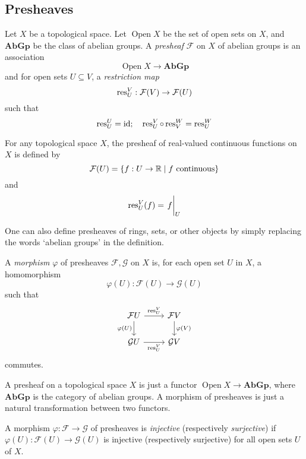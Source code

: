 \subsection{Presheaves}
\begin{definition}
    Let \( X \) be a topological space.
    Let \( \operatorname{Open} X \) be the set of open sets on \( X \), and \( \mathbf{AbGp} \) be the class of abelian groups.
    A \emph{presheaf} \( \mathcal F \) on \( X \) of abelian groups is an association
    \[ \operatorname{Open} X \to \mathbf{AbGp} \]
    and for open sets \( U \subseteq V \), a \emph{restriction map}
    \[ \operatorname{res}_U^V : \mathcal F(V) \to \mathcal F(U) \]
    such that
    \[ \operatorname{res}_U^U = \operatorname{id};\quad \operatorname{res}_U^V \circ \operatorname{res}_V^W = \operatorname{res}_U^W \]
\end{definition}
\begin{example}
    For any topological space \( X \), the presheaf of real-valued continuous functions on \( X \) is defined by
    \[ \mathcal F(U) = \qty{f : U \to \mathbb R \mid f \text{ continuous}} \]
    and
    \[ \res_U^V(f) = \eval{f}_U \]
\end{example}
One can also define presheaves of rings, sets, or other objects by simply replacing the words `abelian groups' in the definition.
\begin{definition}
    A \emph{morphism} \( \varphi \) of presheaves \( \mathcal F, \mathcal G \) on \( X \) is, for each open set \( U \) in \( X \), a homomorphism
    \[ \varphi(U) : \mathcal F(U) \to \mathcal G(U) \]
    such that
    \[\begin{tikzcd}
        {\mathcal F U} & {\mathcal F V} \\
        {\mathcal G U} & {\mathcal G V}
        \arrow["{\res_U^V}", from=1-1, to=1-2]
        \arrow["{\varphi(V)}", from=1-2, to=2-2]
        \arrow["{\varphi(U)}"', from=1-1, to=2-1]
        \arrow["{\res_U^V}"', from=2-1, to=2-2]
    \end{tikzcd}\]
    commutes.
\end{definition}
\begin{remark}
    A presheaf on a topological space \( X \) is just a functor \( \operatorname{Open} X \to \mathbf{AbGp} \), where \( \mathbf{AbGp} \) is the category of abelian groups.
    A morphism of presheaves is just a natural transformation between two functors.
\end{remark}
\begin{definition}
    A morphism \( \varphi : \mathcal F \to \mathcal G \) of presheaves is \emph{injective} (respectively \emph{surjective}) if \( \varphi(U) : \mathcal F(U) \to \mathcal G(U) \) is injective (respectively surjective) for all open sets \( U \) of \( X \).
\end{definition}
